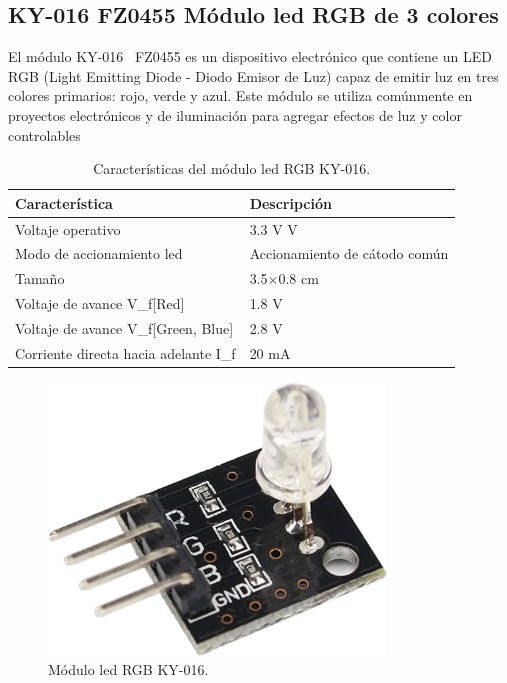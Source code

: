 \subsection{KY-016 FZ0455 Módulo led RGB de 3 colores}
El módulo KY-016~\cite{manual:LedRGB} FZ0455 es un dispositivo electrónico que contiene un LED RGB (Light Emitting Diode - Diodo Emisor de Luz) capaz de emitir luz en tres colores primarios: rojo, verde y azul. Este módulo se utiliza comúnmente en proyectos electrónicos y de iluminación para agregar efectos de luz y color controlables

\begin{table}[htbp]
\begin{center}
\caption{Características del módulo led RGB KY-016.}
\begin{tabular}{|l|l|} %
\hline
\rowcolor[HTML]{C0C0C0} 
\textbf{Característica} & \textbf{Descripción}\\ \hline
Voltaje operativo & 3.3 V\quad5 V\\ \hline
Modo de accionamiento led & Accionamiento de cátodo común \\ \hline
Tamaño & 3.5$\times$0.8 cm\\ \hline
Voltaje de avance V_{f}[Red] & 1.8 V \\ \hline
Voltaje de avance V_{f}[Green, Blue] & 2.8 V \\ \hline
Corriente directa hacia adelante I_{f} & 20 mA \\ \hline
\end{tabular}
\end{center}
\end{table}

\begin{figure}[h]
    \centering
    \includegraphics[width=0.8\textwidth]{img/herramientas/LedRGB.png}
    \caption{Módulo led RGB KY-016.} \label{Img:LedRGB}
\end{figure}

